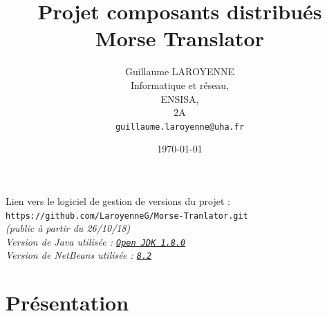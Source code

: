 \documentclass[a4paper,11pt]{article}
\title{\LARGE{Projet composants distribués}\\\bigskip \textbf{Morse Translator}}
\author{Guillaume LAROYENNE\\
Informatique et réseau,\\
ENSISA,\\
2A\\
\bigskip
\texttt{guillaume.laroyenne@uha.fr}
}
\date{\today}
\begin{document}
    \maketitle
    \vspace{2cm}
    \begin{center}
        \large{Lien vers le logiciel de gestion de versions du projet :} \texttt{https://github.com/LaroyenneG/Morse-Tranlator.git} \\
        \small{\textit{(public à partir du 26/10/18)}}
        \\[2cm]
        \textit{Version de Java utilisée : \texttt{\underline{Open JDK 1.8.0}}}\\
        \textit{Version de NetBeans utilisée : \texttt{\underline{8.2}}}
    \end{center}

    \newpage

    \tableofcontents

    \newpage

    \section{Présentation}
\end{document}
